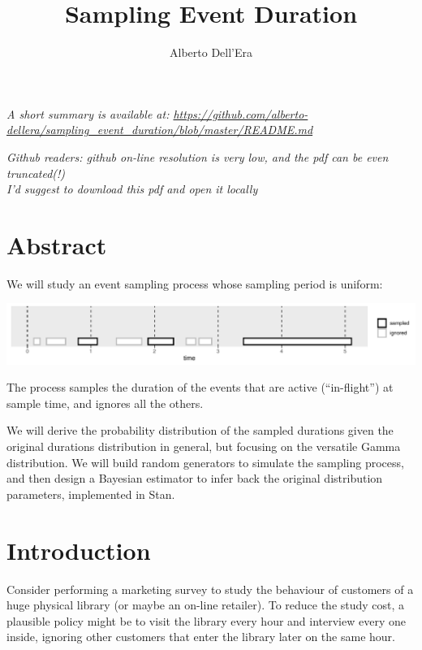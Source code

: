 \documentclass[]{article}
\title{Sampling Event Duration}
\author{Alberto Dell'Era}
\date{}
\begin{document}
\maketitle

\emph{A short summary is available at:
\url{https://github.com/alberto-dellera/sampling_event_duration/blob/master/README.md}}

\emph{Github readers: github on-line resolution is very low, and the pdf
can be even truncated(!)\\
I'd suggest to download this pdf and open it locally}

\hypertarget{abstract}{%
\section{Abstract}\label{abstract}}

We will study an event sampling process whose sampling period is
uniform:

\begin{center}\includegraphics[width=1.0\textwidth]{sampling_event_duration_files/figure-latex/abstract_sampling_illustration-1} \end{center}

The process samples the duration of the events that are active
(``in-flight'') at sample time, and ignores all the others.

We will derive the probability distribution of the sampled durations
given the original durations distribution in general, but focusing on
the versatile Gamma distribution. We will build random generators to
simulate the sampling process, and then design a Bayesian estimator to
infer back the original distribution parameters, implemented in Stan.

\hypertarget{introduction}{%
\section{Introduction}\label{introduction}}

Consider performing a marketing survey to study the behaviour of
customers of a huge physical library (or maybe an on-line retailer). To
reduce the study cost, a plausible policy might be to visit the library
every hour and interview every one inside, ignoring other customers that
enter the library later on the same hour.
\end{document}
